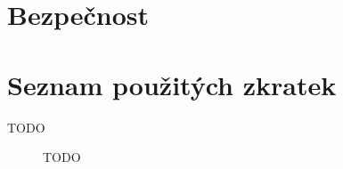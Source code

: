 \documentclass[thesis=B,czech]{FITthesis}[2012/06/26]
\begin{document}
\chapter{Bezpečnost}

\begin{conclusion}

    

\end{conclusion}




\appendix

\chapter{Seznam použitých zkratek}
\begin{description}

    \item[TODO] TODO

\end{description}
\end{document}

